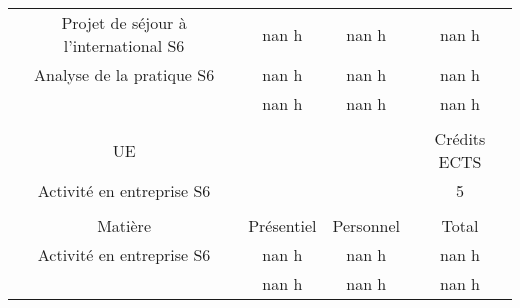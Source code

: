 \begin{longtable}{c c c c}
Projet de séjour à l'international S6&nan h&nan h&nan h\\%
Analyse de la pratique S6&nan h&nan h&nan h\\%
\hline%
&nan h&nan h&nan h\\%
\hline%
&&&\\%
UE&&&Crédits ECTS\\%
Activité en entreprise S6&&&5\\%
&&&\\%
Matière&Présentiel&Personnel&Total\\%
Activité en entreprise S6&nan h&nan h&nan h\\%
\hline%
&nan h&nan h&nan h\\%
\hline%
\end{longtable}